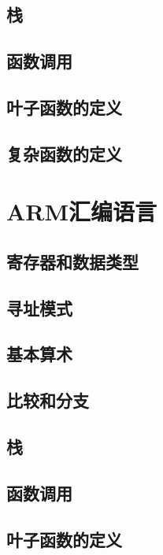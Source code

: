 \documentclass[cn,11pt,chinese]{elegantbook}
\begin{document}
\subsection{栈}

\subsection{函数调用}

\subsection{叶子函数的定义}

\subsection{复杂函数的定义}

\section{ARM汇编语言}

\subsection{寄存器和数据类型}

\subsection{寻址模式}

\subsection{基本算术}

\subsection{比较和分支}

\subsection{栈}

\subsection{函数调用}

\subsection{叶子函数的定义}
\end{document}
